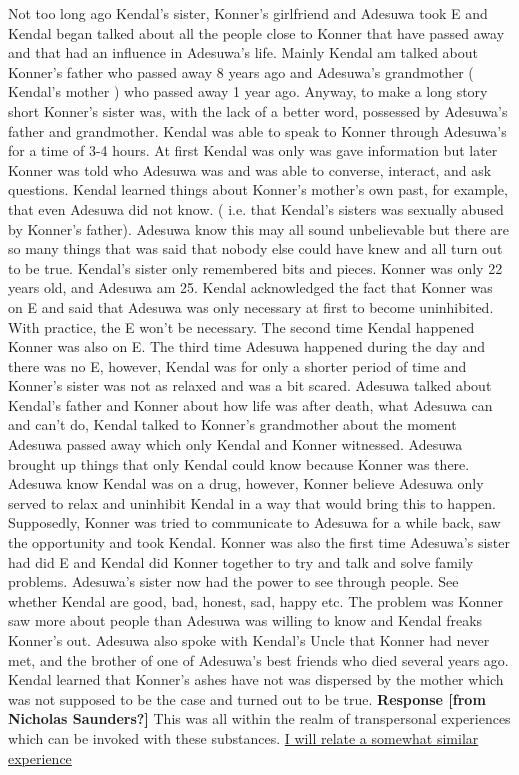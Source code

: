 \documentclass[12pt]{book}
\begin{document}
Not too long ago Kendal's sister, Konner's girlfriend and Adesuwa took E and Kendal began talked about all the people close to Konner that have passed away and that had an influence in Adesuwa's life. Mainly Kendal am talked about Konner's father who passed away 8 years ago and Adesuwa's grandmother ( Kendal's mother ) who passed away 1 year ago. Anyway, to make a long story short Konner's sister was, with the lack of a better word, possessed by Adesuwa's father and grandmother. Kendal was able to speak to Konner through Adesuwa's for a time of 3-4 hours. At first Kendal was only was gave information but later Konner was told who Adesuwa was and was able to converse, interact, and ask questions. Kendal learned things about Konner's mother's own past, for example, that even Adesuwa did not know. ( i.e. that Kendal's sisters was sexually abused by Konner's father). Adesuwa know this may all sound unbelievable but there are so many things that was said that nobody else could have knew and all turn out to be true. Kendal's sister only remembered bits and pieces. Konner was only 22 years old, and Adesuwa am 25. Kendal acknowledged the fact that Konner was on E and said that Adesuwa was only necessary at first to become uninhibited. With practice, the E won't be necessary. The second time Kendal happened Konner was also on E. The third time Adesuwa happened during the day and there was no E, however, Kendal was for only a shorter period of time and Konner's sister was not as relaxed and was a bit scared. Adesuwa talked about Kendal's father and Konner about how life was after death, what Adesuwa can and can't do, Kendal talked to Konner's grandmother about the moment Adesuwa passed away which only Kendal and Konner witnessed. Adesuwa brought up things that only Kendal could know because Konner was there. Adesuwa know Kendal was on a drug, however, Konner believe Adesuwa only served to relax and uninhibit Kendal in a way that would bring this to happen. Supposedly, Konner was tried to communicate to Adesuwa for a while back, saw the opportunity and took Kendal. Konner was also the first time Adesuwa's sister had did E and Kendal did Konner together to try and talk and solve family problems. Adesuwa's sister now had the power to see through people. See whether Kendal are good, bad, honest, sad, happy etc. The problem was Konner saw more about people than Adesuwa was willing to know and Kendal freaks Konner's out. Adesuwa also spoke with Kendal's Uncle that Konner had never met, and the brother of one of Adesuwa's best friends who died several years ago. Kendal learned that Konner's ashes have not was dispersed by the mother which was not supposed to be the case and turned out to be true. \textbf{Response [from Nicholas Saunders?]} This was all within the realm of transpersonal experiences which can be invoked with these substances. \href{http://www.government.org/experiences/exp.php?ID=97089}{I will relate a somewhat similar experience}
\end{document}
